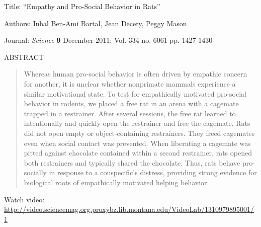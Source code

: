 \def\theTopic{Reading 5}

Title:  ``Empathy and Pro-Social Behavior in Rats''

Authors: Inbal Ben-Ami Bartal, Jean Decety, Peggy Mason

Journal: {\it Science} {\bf 9} December 2011: Vol. 334 no. 6061 pp. 1427-1430 


ABSTRACT\\
\begin{quotation}
  Whereas human pro-social behavior is often driven by empathic concern
for another, it is unclear whether nonprimate mammals experience a
similar motivational state. To test for empathically motivated
pro-social behavior in rodents, we placed a free rat in an arena with
a cagemate trapped in a restrainer. After several sessions, the free
rat learned to intentionally and quickly open the restrainer and free
the cagemate. Rats did not open empty or object-containing
restrainers. They freed cagemates even when social contact was
prevented. When liberating a cagemate was pitted against chocolate
contained within a second restrainer, rats opened both restrainers and
typically shared the chocolate. Thus, rats behave pro-socially in
response to a conspecific’s distress, providing strong evidence for
biological roots of empathically motivated helping behavior. 


\end{quotation}



Watch video:
\url{http://video.sciencemag.org.proxybz.lib.montana.edu/VideoLab/1310979895001/1}


